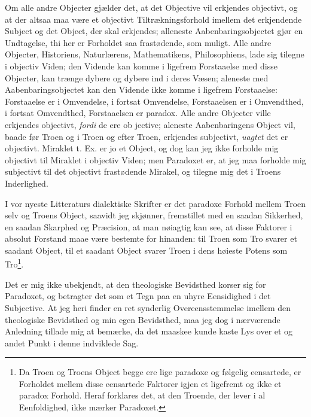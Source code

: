 \documentclass[12pt,a4paper]{book}
\newcommand{\opage}[1]{\marginnote{\footnotesize\textit{[#1]}}}
\begin{document}
Om alle andre Objecter gjælder det, at det Objective vil erkjendes objectivt,
og at der altsaa maa være et objectivt Tiltrækningsforhold imellem det
erkjendende Subject og det Object, der skal erkjendes; alleneste
Aabenbaringsobjectet gjør en Undtagelse, thi her er Forholdet saa frastødende,
som muligt. Alle andre Objecter, Historiens, Naturlærens, Mathematikens,
Philosophiens, lade sig tilegne i objectiv Viden; den Vidende kan komme i
ligefrem Forstaaelse med disse Objecter, kan trænge dybere og dybere ind i
deres Væsen; aleneste med Aabenbaringsobjectet kan den Vidende ikke komme i
ligefrem Forstaaelse: Forstaaelse er i Omvendelse, i fortsat Omvendelse,
Forstaaelsen er i Omvendthed, i fortsat Omvendthed, Forstaaelsen er paradox.
Alle andre Objecter ville erkjendes objectivt, \emph{fordi} de ere ob\-%
\opage{125}jective; aleneste Aabenbaringens Object vil, baade før Troen og i Troen og
efter Troen, erkjendes subjectivt, \emph{uagtet} det er objectivt.
Miraklet t. Ex. er jo et Object, og dog kan jeg ikke forholde mig objectivt til
Miraklet i objectiv Viden; men Paradoxet er, at jeg maa forholde mig subjectivt
til det objectivt frastødende Mirakel, og tilegne mig det i Troens Inderlighed.

I vor nyeste Litteraturs dialektiske Skrifter er det paradoxe Forhold mellem
Troen selv og Troens Object, saavidt jeg skjønner, fremstillet med en saadan
Sikkerhed, en saadan Skarphed og Præcision, at man nøiagtig kan see, at disse
Faktorer i absolut Forstand maae være bestemte for hinanden: til Troen som Tro
svarer et saadant Object, til et saadant Object svarer Troen i dens høieste
Potens som Tro\footnote{Da Troen og Troens Object begge ere lige paradoxe og
følgelig eensartede, er Forholdet mellem disse eensartede Faktorer igjen et
ligefremt og ikke et paradox Forhold. Heraf forklares det, at den Troende, der
lever i al Eenfoldighed, ikke mærker Paradoxet.}.

Det er mig ikke ubekjendt, at den theologiske Bevidsthed korser sig for
Paradoxet, og betragter det som et Tegn paa en uhyre Eensidighed i det
Subjective. At jeg heri finder en ret synderlig Overeensstemmelse imellem den
theologiske Bevidsthed og min egen Bevidsthed, maa jeg dog i nærværende
Anledning tillade mig at bemærke, da det maaskee kunde kaste Lys over et og
andet Punkt i denne indviklede Sag.
\end{document}
